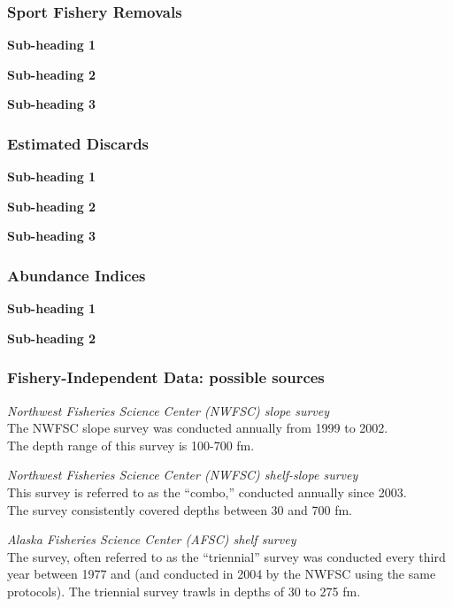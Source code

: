\documentclass[12pt,]{article}
\begin{document}
\subsubsection{Sport Fishery Removals}\label{sport-fishery-removals}

\textbf{Sub-heading 1}

\textbf{Sub-heading 2}

\textbf{Sub-heading 3}

\subsubsection{Estimated Discards}\label{estimated-discards}

\textbf{Sub-heading 1}

\textbf{Sub-heading 2}

\textbf{Sub-heading 3}

\subsubsection{Abundance Indices}\label{abundance-indices}

\textbf{Sub-heading 1}

\textbf{Sub-heading 2}

\subsubsection{Fishery-Independent Data: possible
sources}\label{fishery-independent-data-possible-sources}

\emph{Northwest Fisheries Science Center (NWFSC) slope survey}\\
The NWFSC slope survey was conducted annually from 1999 to 2002.\\
The depth range of this survey is 100-700 fm.

\emph{Northwest Fisheries Science Center (NWFSC) shelf-slope survey}\\
This survey is referred to as the ``combo,'' conducted annually since
2003.\\
The survey consistently covered depths between 30 and 700 fm.

\emph{Alaska Fisheries Science Center (AFSC) shelf survey}\\
The survey, often referred to as the ``triennial'' survey was conducted
every third year between 1977 and (and conducted in 2004 by the NWFSC
using the same protocols). The triennial survey trawls in depths of 30
to 275 fm.
\end{document}
